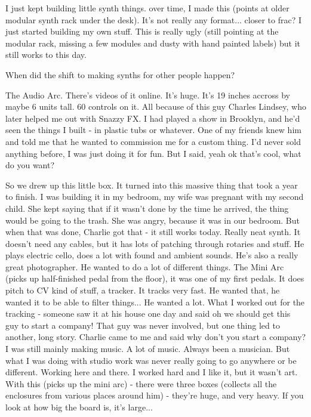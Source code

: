 I just kept building little synth things. over time, I made this (points at older modular synth rack under the desk). It's not really any format... closer to frac? I just started building my own stuff. This is really ugly (still pointing at the modular rack, missing a few modules and dusty with hand painted labels) but it still works to this day. 

When did the shift to making synths for other people happen? 

The Audio Arc. There's videos of it online. It's huge. It's 19 inches accross by maybe 6 units tall. 60 controls on it. All because of this guy Charles Lindsey, who later helped me out with Snazzy FX. I had played a show in Brooklyn, and he'd seen the things I built - in plastic tubs or whatever. One of my friends knew him and told me that he wanted to commission me for a custom thing. I'd never sold anything before, I was just doing it for fun.  But I said, yeah ok that's cool, what do you want? 

So we drew up this little box. It turned into this massive thing that took a year to finish. I was building it in my bedroom, my wife was pregnant with my second child. She kept saying that if it wasn't done by the time he arrived, the thing would be going to the trash. She was angry, because it was in our bedroom. But when that was done, Charlie got that - it still works today. Really neat synth. It doesn't need any cables, but it has lots of patching through rotaries and stuff. He plays electric cello, does a lot with found and ambient sounds. He's also a really great photographer. He wanted to do a lot of different things. The Mini Arc (picks up half-finished pedal from the floor), it was one of my first pedals. It does pitch to CV kind of stuff, a tracker. It tracks very fast. He wanted that, he wanted it to be able to filter things... He wanted a lot. What I worked out for the tracking - someone saw it at his house one day and said oh we should get this guy to start a company! That guy was never involved, but one thing led to another, long story. Charlie came to me and said why don't you start a company? I was still mainly making music. A lot of music. Always been a musician. But what I was doing with studio work was never really going to go anywhere or be different. Working here and there. I worked hard and I like it, but it wasn't art. With this (picks up the mini arc) - there were three boxes (collects all the enclosures from various places around him) - they're huge, and very heavy. If you look at how big the board is, it's large... 

